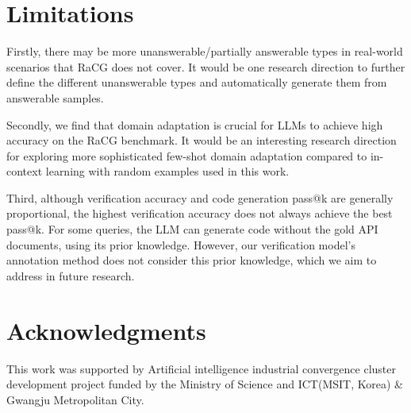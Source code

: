 \documentclass[11pt]{article}
\begin{document}
\section*{Limitations}
Firstly, there may be more unanswerable/partially answerable types in real-world scenarios that RaCG does not cover. It would be one research direction to further define the different unanswerable types and automatically generate them from answerable samples.

Secondly, we find that domain adaptation is crucial for LLMs to achieve high accuracy on the RaCG benchmark. It would be an interesting research direction for exploring more sophisticated few-shot domain adaptation compared to in-context learning with random examples used in this work.

Third, although verification accuracy and code generation pass@k are generally proportional, the highest verification accuracy does not always achieve the best pass@k. For some queries, the LLM can generate code without the gold API documents, using its prior knowledge. However, our verification model’s annotation method does not consider this prior knowledge, which we aim to address in future research.

\section*{Acknowledgments}
This work was supported by Artificial intelligence industrial convergence cluster development project funded by the Ministry of Science and ICT(MSIT, Korea) \& Gwangju Metropolitan City.

\newpage
%



\end{document}
